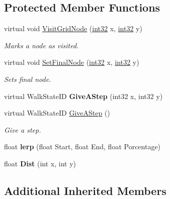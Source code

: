 \subsection*{Protected Member Functions}
\begin{DoxyCompactItemize}
\item 
virtual void \hyperlink{classae_influence_calculator_a8f31c5a25ca68ef970247f608bb51917}{Visit\+Grid\+Node} (\hyperlink{namespaceae_core_a862bc39eb87cfabca273f49e2a920129}{int32} x, \hyperlink{namespaceae_core_a862bc39eb87cfabca273f49e2a920129}{int32} y)
\begin{DoxyCompactList}\small\item\em Marks a node as visited. \end{DoxyCompactList}\item 
virtual void \hyperlink{classae_influence_calculator_ab542ea1dd26801211d06e77ba078ebe2}{Set\+Final\+Node} (\hyperlink{namespaceae_core_a862bc39eb87cfabca273f49e2a920129}{int32} x, \hyperlink{namespaceae_core_a862bc39eb87cfabca273f49e2a920129}{int32} y)
\begin{DoxyCompactList}\small\item\em Sets final node. \end{DoxyCompactList}\item 
virtual Walk\+State\+ID {\bfseries Give\+A\+Step} (int32 x, int32 y)\hypertarget{classae_influence_calculator_a3195d218f0580918600336418df7daed}{}\label{classae_influence_calculator_a3195d218f0580918600336418df7daed}

\item 
virtual Walk\+State\+ID \hyperlink{classae_influence_calculator_aff6d5b8b52fb73a4c87a3b311adc6245}{Give\+A\+Step} ()
\begin{DoxyCompactList}\small\item\em Give a step. \end{DoxyCompactList}\item 
float {\bfseries lerp} (float Start, float End, float Porcentage)\hypertarget{classae_influence_calculator_a2319a79402f14228159d40380ff9e3b2}{}\label{classae_influence_calculator_a2319a79402f14228159d40380ff9e3b2}

\item 
float {\bfseries Dist} (int x, int y)\hypertarget{classae_influence_calculator_aef42a7d51c210b1ace9861975a5785ac}{}\label{classae_influence_calculator_aef42a7d51c210b1ace9861975a5785ac}

\end{DoxyCompactItemize}
\subsection*{Additional Inherited Members}


